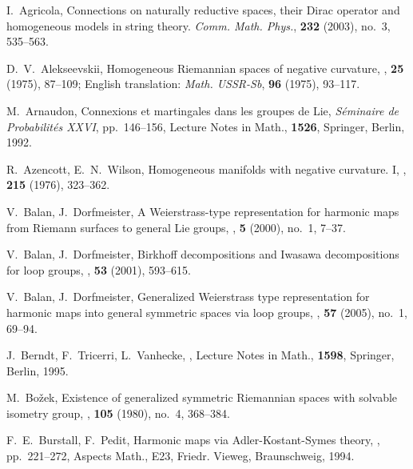 \documentclass[12pt]{amsart}
\theoremstyle{definition}
\theoremstyle{remark}
\numberwithin{equation}{section}
\begin{document}


\begin{thebibliography}{10}

 I.~Agricola, 
 Connections on naturally reductive spaces, 
 their Dirac operator and homogeneous models in string theory. 
 {\em Comm. Math. Phys.}, \textbf{232} (2003), no.~3, 535--563.

 D.~V.~Alekseevskii,
 \newblock Homogeneous Riemannian spaces of negative curvature,
 , \textbf{25} (1975), 87--109; English translation: 
 {\em Math. USSR-Sb}, \textbf{96} (1975), 93--117.

 M.~Arnaudon, 
 \newblock Connexions et martingales dans les groupes de Lie, 
 \textit{S{\'e}minaire de Probabilit{\'e}s XXVI}, pp.~146--156,
 \newblock Lecture Notes in Math., \textbf{1526}, Springer, Berlin, 1992.

 R.~Azencott, E.~N.~Wilson, 
 \newblock Homogeneous manifolds with negative curvature. I,
 , \textbf{215} (1976), 323--362. 

 V.~Balan, J.~Dorfmeister,
 \newblock A {W}eierstrass-type representation for harmonic maps from {R}iemann surfaces 
           to general {L}ie groups,
 , \textbf{5} (2000), no.~1, 7--37.

 V.~Balan, J.~Dorfmeister, 
 \newblock Birkhoff decompositions and Iwasawa decompositions for loop groups, 
 , \textbf{53} (2001), 593--615.

  V.~Balan, J.~Dorfmeister, 
 \newblock Generalized Weierstrass type representation for harmonic maps into 
         general symmetric spaces via loop groups,
 , \textbf{57} (2005), no.~1, 69--94.

 J.~Berndt, F.~Tricerri, L.~Vanhecke,
 , 
 \newblock Lecture Notes in Math., \textbf{1598}, Springer,  Berlin, 1995.

 M.~Bo{\v z}ek, 
 \newblock Existence of generalized symmetric Riemannian spaces with 
          solvable isometry group,
 , \textbf{105} (1980), no.~4, 368--384.

 F.~E.~Burstall, F.~Pedit,
 \newblock Harmonic maps via Adler-Kostant-Symes theory, 
 , 
 pp.~221--272, Aspects Math., E23, Friedr. Vieweg, 
 Braunschweig, 1994.


\end{thebibliography}
\end{document}
